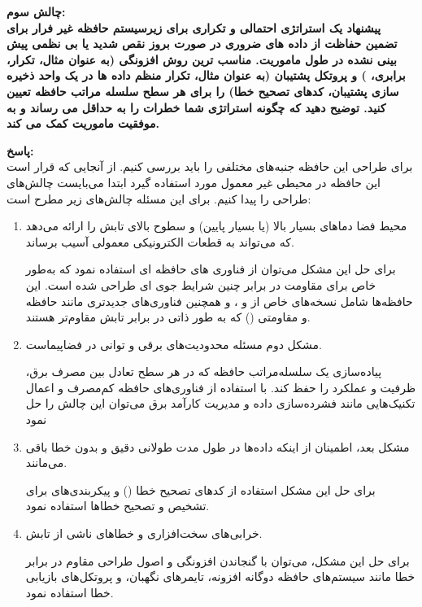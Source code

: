 \documentclass[12pt]{exam}
\begin{document}
\begin{questions}
\textbf{چالش سوم:}\\
\textbf{پیشنهاد یک استراتژی احتمالی و تکراری برای زیرسیستم حافظه غیر فرار برای تضمین حفاظت از داده های ضروری در صورت بروز نقص شدید یا بی نظمی پیش بینی نشده در طول ماموریت. مناسب ترین روش افزونگی (به عنوان مثال، تکرار، برابری، ) و پروتکل پشتیبان (به عنوان مثال، تکرار منظم داده ها در یک واحد ذخیره سازی پشتیبان، کدهای تصحیح خطا) را برای هر سطح سلسله مراتب حافظه تعیین کنید. توضیح دهید که چگونه استراتژی شما خطرات را به حداقل می رساند و به موفقیت ماموریت کمک می کند.}


\textbf{پاسخ:}\\
برای طراحی این حافظه جنبه‌های مختلفی را باید بررسی کنیم. از آنجایی که قرار است این حافظه در محیطی غیر معمول مورد استفاده گیرد ابتدا می‌بایست چالش‌های طراحی را پیدا کنیم. برای این مسئله چالش‌های زیر مطرح است:

\begin{enumerate}
	\item محیط فضا دماهای بسیار بالا (یا بسیار پایین) و سطوح بالای تابش را ارائه می‌دهد که می‌تواند به قطعات الکترونیکی معمولی آسیب برساند.
	
	برای حل این مشکل می‌توان از فناوری های حافظه ای استفاده نمود که به‌طور خاص برای مقاومت در برابر چنین شرایط جوی ای طراحی شده است. این حافظه‌ها شامل نسخه‌های خاص از  و  ، و همچنین فناوری‌های جدیدتری مانند حافظه  و  مقاومتی () که به طور ذاتی در برابر تابش مقاوم‌تر هستند.
	
	\item 
	مشکل دوم مسئله محدودیت‌های برقی و توانی در فضاپیماست.
	
	پیاده‌سازی یک سلسله‌مراتب حافظه که در هر سطح تعادل بین مصرف برق، ظرفیت و عملکرد را حفظ کند. با استفاده از فناوری‌های حافظه کم‌مصرف و اعمال تکنیک‌هایی مانند فشرده‌سازی داده و مدیریت کارآمد برق می‌توان این چالش را حل نمود
	
	\item 
	مشکل بعد، اطمینان از اینکه داده‌ها در طول مدت طولانی دقیق و بدون خطا باقی می‌مانند.
	
	برای حل این مشکل استفاده از کدهای تصحیح خطا () و پیکربندی‌های  برای تشخیص و تصحیح خطاها استفاده نمود.
	
	\item 
	خرابی‌های سخت‌افزاری و خطاهای ناشی از تابش.
	
	برای حل این مشکل، می‌توان با گنجاندن افزونگی و اصول طراحی مقاوم در برابر خطا مانند سیستم‌های حافظه دوگانه افزونه، تایمرهای نگهبان، و پروتکل‌های بازیابی خطا استفاده نمود.
	

\end{enumerate}
\end{questions}
\end{document}
